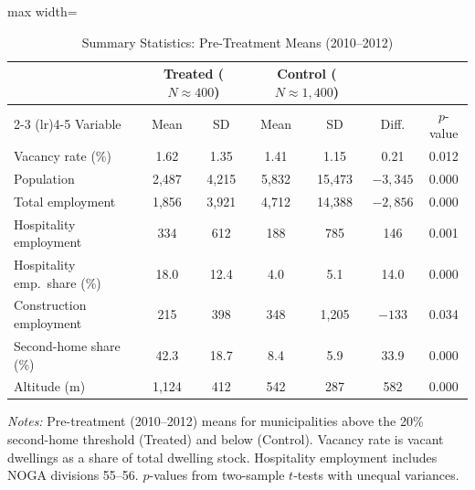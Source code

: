 \begin{table}[H]
\centering
\caption{Summary Statistics: Pre-Treatment Means (2010--2012)}
\label{tab:summary}
\begin{threeparttable}
\begin{adjustbox}{max width=\textwidth}
\begin{tabular}{lcccccc}
\toprule
& \multicolumn{2}{c}{Treated ($N \approx 400$)} & \multicolumn{2}{c}{Control ($N \approx 1{,}400$)} & & \\
\cmidrule(lr){2-3} \cmidrule(lr){4-5}
Variable & Mean & SD & Mean & SD & Diff. & $p$-value \\
\midrule
Vacancy rate (\%) & 1.62 & 1.35 & 1.41 & 1.15 & 0.21 & 0.012 \\
Population & 2{,}487 & 4{,}215 & 5{,}832 & 15{,}473 & $-3{,}345$ & 0.000 \\
Total employment & 1{,}856 & 3{,}921 & 4{,}712 & 14{,}388 & $-2{,}856$ & 0.000 \\
Hospitality employment & 334 & 612 & 188 & 785 & 146 & 0.001 \\
Hospitality emp.\ share (\%) & 18.0 & 12.4 & 4.0 & 5.1 & 14.0 & 0.000 \\
Construction employment & 215 & 398 & 348 & 1{,}205 & $-133$ & 0.034 \\
Second-home share (\%) & 42.3 & 18.7 & 8.4 & 5.9 & 33.9 & 0.000 \\
Altitude (m) & 1{,}124 & 412 & 542 & 287 & 582 & 0.000 \\
\bottomrule
\end{tabular}
\end{adjustbox}
\begin{tablenotes}[flushleft]
\small
\item \textit{Notes:} Pre-treatment (2010--2012) means for municipalities above the 20\% second-home threshold (Treated) and below (Control). Vacancy rate is vacant dwellings as a share of total dwelling stock. Hospitality employment includes NOGA divisions 55--56. $p$-values from two-sample $t$-tests with unequal variances.
\end{tablenotes}
\end{threeparttable}
\end{table}
